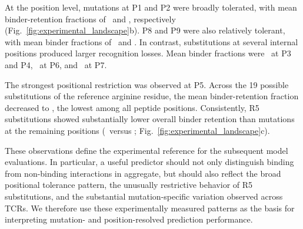 \documentclass{article}
\begin{document}
At the position level, mutations at P1 and P2 were broadly tolerated, with
mean binder-retention fractions of \valBinderFracPone\ and \valBinderFracPtwo, respectively
(Fig.~\ref{fig:experimental_landscape}b). P8 and P9 were also relatively
tolerant, with mean binder fractions of \valBinderFracPeight\ and \valBinderFracPnine. In contrast,
substitutions at several internal positions produced larger recognition
losses. Mean binder fractions were \valBinderFracPthree\ at P3 and P4, \valBinderFracPsix\ at P6, and
\valBinderFracPseven\ at P7.

The strongest positional restriction was observed at P5. Across the 19
possible substitutions of the reference arginine residue, the mean
binder-retention fraction decreased to \valBinderFracPfive, the lowest among all peptide
positions. Consistently, R5 substitutions showed substantially lower
overall binder retention than mutations at the remaining positions
(\valBinderFracRfive\ versus \valBinderFracnonRfive; Fig.~\ref{fig:experimental_landscape}c).

These observations define the experimental reference for the subsequent
model evaluations. In particular, a useful predictor should not only
distinguish binding from non-binding interactions in aggregate, but should
also reflect the broad positional tolerance pattern, the unusually
restrictive behavior of R5 substitutions, and the substantial
mutation-specific variation observed across TCRs. We therefore use these
experimentally measured patterns as the basis for interpreting
mutation- and position-resolved prediction performance.


\end{document}
